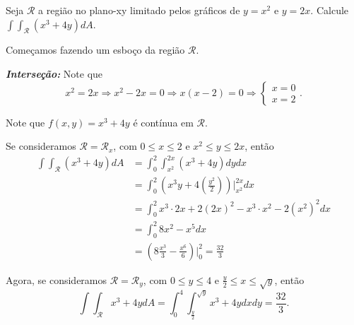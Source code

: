 \begin{example}
    Seja \(\mathcal{R}\) a região no plano-xy limitado pelos gráficos de \(y = x^2\) e \(y=2x\). Calcule \(\int\int_\mathcal{R} (x^3 + 4y) dA.\)

    Começamos fazendo um esboço da região \(\mathcal{R}\).

    \textbf{\textit{Interseção: }} Note que \[x^2 = 2x \Rightarrow x^2 - 2x =0 \Rightarrow x(x-2) =0 \Rightarrow \begin{cases}
        x=0 \\
        x=2
    \end{cases}.\]

    Note que \(f(x,y) = x^3 + 4y\) é contínua em \(\mathcal{R}\).

    Se consideramos \(\mathcal{R} = \mathcal{R}_x\), com \(0\leq x \leq 2\) e \(x^2 \leq y \leq 2x\), então
        \begin{align*}
            \int\int_\mathcal{R} (x^3 + 4y) dA
                & = \int_0^2 \int_{x^2}^{2x} (x^3 + 4y) dy dx \\
                & = \int_0^2 \left( x^3 y + 4\left( \frac{y^2}{2} \right) \right)\bigg|_{x^2}^{2x} dx \\
                & = \int_0^2 x^3\cdot 2x + 2(2x)^2 - x^3\cdot x^2 - 2(x^2)^2 dx \\
                & = \int_0^2 8x^2 - x^5 dx \\
                & = \left( 8\frac{x^3}{3} - \frac{x^6}{6} \right)\bigg|_0^2 = \frac{32}{3}
        \end{align*}

    Agora, se consideramos \(\mathcal{R} = \mathcal{R}_y\), com \(0\leq y\leq 4\) e \(\frac{y}{2} \leq x \leq \sqrt{y}\), então \[\int\int_\mathcal{R} x^3 + 4y dA = \int_0^4 \int_{\frac{y}{2}}^{\sqrt{y}} x^3 + 4y dx dy = \frac{32}{3}.\]
\end{example}

